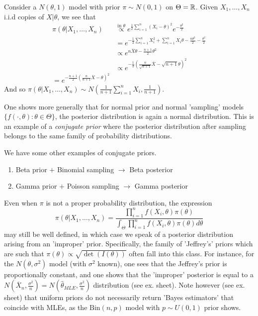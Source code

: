 \documentclass[a4paper]{article}
\begin{document}
\begin{eg}
	Consider a $N(\theta, 1)$ model with prior $\pi\sim N(0,1)$ on $\Theta = \mathbb{R} $. Given $X_1, \ldots, X_n$ i.i.d copies of $X|\theta$, we see that
	\begin{align*}
		\pi(\theta |X_1, \ldots, X_n) &\overset{\text{in $\theta$}}{\propto} e^{\frac{1}{2}\sum_{i=1}^{n}(X_i - \theta)^2}e^{-\frac{\theta^2}{2}} \\
		&= e^{-\frac{1}{2} \sum_{i=1}^{n}X_i^2 + \sum_{i=1}^{n}X_i \theta - \frac{n\theta^2}{2} - \frac{\theta^2}{2}} \\
		&\propto e^{n\overline{X}\theta - \frac{n+1}{2}\theta^2} \\
		&\propto e^{-\frac{1}{2} \left( \frac{n}{\sqrt{n+1}} \overline{X} - \sqrt{n+1} \theta  \right)^2 } \\
		= e^{-\frac{n+1}{2}\left(\frac{n}{n+1}\overline{X} - \theta  \right)^2 }
	 \end{align*}
	 And so $\pi(\theta|X_1, \ldots, X_n) \sim N(\frac{1}{n+1}\sum_{i=1}^{n}X_i, \frac{1}{n+1})$.
\end{eg}

One shows more generally that for normal prior and normal 'sampling' models $\{f\left( \cdot , \theta \right) : \theta \in \Theta \}$, the posterior distribution is again a normal distribution. This is an example of a \textit{conjugate prior} where the posterior distribution after sampling belongs to the same family of probability distributions.

\begin{eg} We have some other examples of conjugate priors.

	\begin{enumerate}[label=\roman*)]
		\item Beta prior $+$ Binomial sampling $\to $ Beta posterior
		\item Gamma prior $+$ Poisson sampling $\to $ Gamma posterior
	\end{enumerate}
\end{eg}

Even when $\pi$ is not a proper probability distribution, the expression
\[
	\pi(\theta | X_1, \ldots, X_n) = \frac{\prod_{i=1}^{n}f(X_i, \theta) \pi(\theta)}{ \int_{\Theta} \prod_{i=1}^{n}f(X_i, \theta) \pi(\theta) d\theta}
\]
may still be well defined, in which case we speak of a posterior distribution arising from an 'improper' prior. Specifically, the family of 'Jeffrey's' priors which are such that $\pi(\theta) \propto \sqrt{\det(I(\theta))} $ often fall into this class. For instance, for the $N(\theta, \sigma^2)$ model (with $\sigma^2$ known), one sees that the Jeffrey's prior is proportionally constant, and one shows that the 'improper' posterior is equal to a $N(\overline{X}_n, \frac{\sigma^2}{n}) = N(\hat{\theta}_{MLE}, \frac{\sigma^2}{n})$ distribution (see ex. sheet). Note however (see ex. sheet) that uniform priors do not necessarily return 'Bayes estimators' that coincide with MLEs, as the $\text{Bin}(n,p)$ model with $p\sim U(0,1)$ prior shows.
\end{document}
